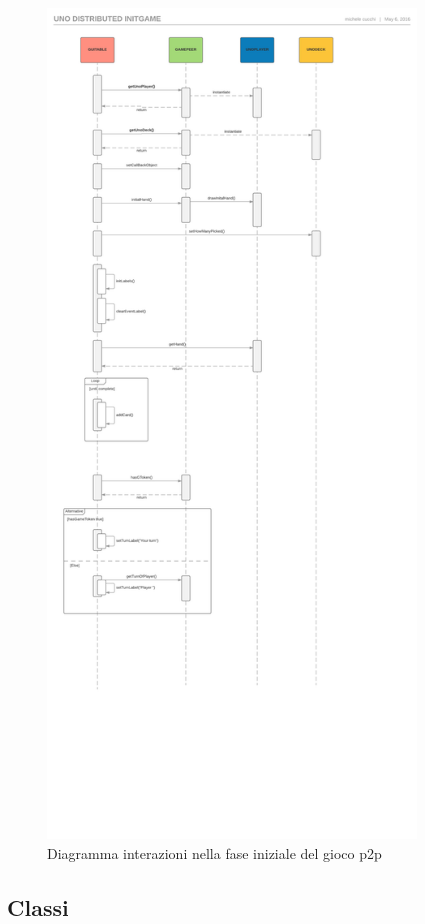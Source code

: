 \documentclass[10pt,a4paper]{article}
\begin{document}
\begin{figure}[H]
\begin{center}
\includegraphics[height=22cm, keepaspectratio]{initgame.png}
\caption{Diagramma interazioni nella fase iniziale del gioco p2p}
\end{center}
\end{figure}

\subsection{Classi}
\end{document}
